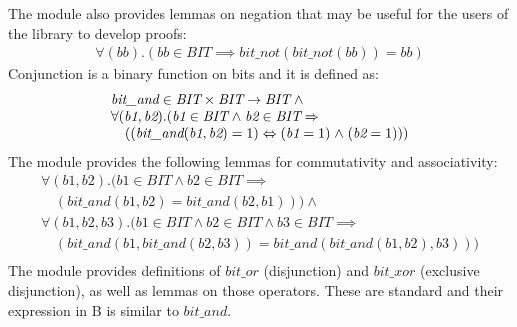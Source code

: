 \documentclass[a4paper]{llncs}
\begin{document}
The module also provides lemmas on negation that may be useful for the
users of the library to develop proofs:
$$
\begin{array}{l}
\forall (\textit{bb}).(\textit{bb} \in \textit{BIT} \implies \textit{bit\_not}(\textit{bit\_not}(\textit{bb})) = \textit{bb})
\end{array}
$$
Conjunction is a binary function on bits and it is defined as:
$$
\begin{array}{l}
\textit{bit\_and} \in \textit{BIT} \times \textit{BIT} \fun \textit{BIT} \land \\
\forall (\textit{b1}, \textit{b2}).(\textit{b1}  \in \textit{BIT}  \land \textit{b2} \in \textit{BIT} \implies \\
\quad ((\textit{bit\_and}(\textit{b1}, \textit{b2}) = 1) \iff (\textit{b1} = 1)  \land  (\textit{b2} = 1)))
\end{array}
$$
The module provides the following lemmas for commutativity and associativity:
$$
\begin{array}{l}
\forall (\textit{b1},\textit{b2}).(\textit{b1} \in \textit{BIT} \land \textit{b2} \in \textit{BIT} \implies \\
\quad (\textit{bit\_and}(\textit{b1}, \textit{b2}) = \textit{bit\_and}(\textit{b2},\textit{b1})))\land \\
\forall (\textit{b1},\textit{b2},\textit{b3}).(\textit{b1} \in \textit{BIT} \land  \textit{b2} \in \textit{BIT} \land \textit{b3} \in \textit{BIT} \implies \\
\quad (\textit{bit\_and}(\textit{b1}, \textit{bit\_and}(\textit{b2},\textit{b3})) = \textit{bit\_and}(\textit{bit\_and}(\textit{b1},\textit{b2}),\textit{b3})))\\
\end{array}
$$
The module provides definitions of $\textit{bit\_or}$ (disjunction)
and $\textit{bit\_xor}$ (exclusive disjunction), as well as lemmas on
those operators. These are standard and their expression in B is
similar to $\textit{bit\_and}$.
\end{document}
